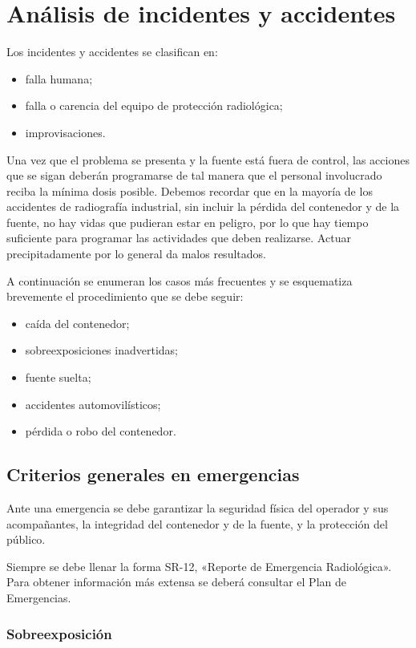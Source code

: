 \chapter{Análisis de incidentes y accidentes}

Los incidentes y accidentes se clasifican en:
\begin{itemize}
  \item falla humana;
  \item falla o carencia del equipo de protección radiológica;
  \item improvisaciones.
\end{itemize}

Una vez que el problema se presenta y la fuente está fuera de control, las acciones que se sigan deberán programarse de tal manera que el personal involucrado reciba la mínima dosis posible. Debemos recordar que en la mayoría de los accidentes de radiografía industrial, sin incluir la pérdida del contenedor y de la fuente, no hay vidas que pudieran estar en peligro, por lo que hay tiempo suficiente para programar las actividades que deben realizarse. Actuar precipitadamente por lo general da malos resultados.

A continuación se enumeran los casos más frecuentes y se esquematiza brevemente el procedimiento que se debe seguir:
\begin{itemize}
  \item caída del contenedor;
  \item sobreexposiciones inadvertidas;
  \item fuente suelta;
  \item accidentes automovilísticos;
  \item pérdida o robo del contenedor.
\end{itemize}

\section{Criterios generales en emergencias}

Ante una emergencia se debe garantizar la seguridad física del operador y sus acompañantes, la integridad del contenedor y de la fuente, y la protección del público.

Siempre se debe llenar la forma SR-12, «Reporte de Emergencia Radiológica». Para obtener información más extensa se deberá consultar el Plan de Emergencias.

\subsection{Sobreexposición}

